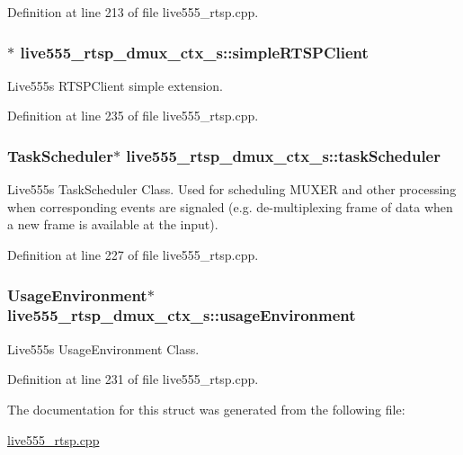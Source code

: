 Definition at line 213 of file live555\+\_\+rtsp.\+cpp.

\subsubsection[{\texorpdfstring{simple\+R\+T\+S\+P\+Client}{simpleRTSPClient}}]{$\ast$ live555\+\_\+rtsp\+\_\+dmux\+\_\+ctx\+\_\+s\+::simple\+R\+T\+S\+P\+Client}\hypertarget{structlive555__rtsp__dmux__ctx__s_a00b7c99aef1216db2e901196d1419059}{}\label{structlive555__rtsp__dmux__ctx__s_a00b7c99aef1216db2e901196d1419059}
Live555\textquotesingle{}s R\+T\+S\+P\+Client simple extension. 

Definition at line 235 of file live555\+\_\+rtsp.\+cpp.

\subsubsection[{\texorpdfstring{task\+Scheduler}{taskScheduler}}]{\setlength{\rightskip}{0pt plus 5cm}Task\+Scheduler$\ast$ live555\+\_\+rtsp\+\_\+dmux\+\_\+ctx\+\_\+s\+::task\+Scheduler}\hypertarget{structlive555__rtsp__dmux__ctx__s_a3211e63d383d152dbaa3348b638af6ae}{}\label{structlive555__rtsp__dmux__ctx__s_a3211e63d383d152dbaa3348b638af6ae}
Live555\textquotesingle{}s Task\+Scheduler Class. Used for scheduling M\+U\+X\+ER and other processing when corresponding events are signaled (e.\+g. de-\/multiplexing frame of data when a new frame is available at the input). 

Definition at line 227 of file live555\+\_\+rtsp.\+cpp.

\subsubsection[{\texorpdfstring{usage\+Environment}{usageEnvironment}}]{\setlength{\rightskip}{0pt plus 5cm}Usage\+Environment$\ast$ live555\+\_\+rtsp\+\_\+dmux\+\_\+ctx\+\_\+s\+::usage\+Environment}\hypertarget{structlive555__rtsp__dmux__ctx__s_ad86f6a45f1dc7215e6fe07ccf91be065}{}\label{structlive555__rtsp__dmux__ctx__s_ad86f6a45f1dc7215e6fe07ccf91be065}
Live555\textquotesingle{}s Usage\+Environment Class. 

Definition at line 231 of file live555\+\_\+rtsp.\+cpp.



The documentation for this struct was generated from the following file\+:\begin{DoxyCompactItemize}
\item 
\hyperlink{live555__rtsp_8cpp}{live555\+\_\+rtsp.\+cpp}\end{DoxyCompactItemize}

